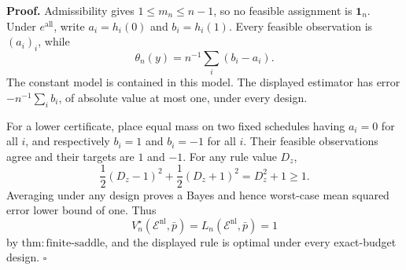 \textbf{Proof.}
Admissibility gives \(1\le m_n\le n-1\), so no feasible assignment is \(\mathbf 1_n\). Under \(e^{\mathrm{all}}\), write \(a_i=h_i(0)\) and \(b_i=h_i(1)\). Every feasible observation is \((a_i)_i\), while
\[
 \theta_n(y)=n^{-1}\sum_i(b_i-a_i). \tag{1}
\]
The constant model is contained in this model. The displayed estimator has error \(-n^{-1}\sum_i b_i\), of absolute value at most one, under every design.

For a lower certificate, place equal mass on two fixed schedules having \(a_i=0\) for all \(i\), and respectively \(b_i=1\) and \(b_i=-1\) for all \(i\). Their feasible observations agree and their targets are \(1\) and \(-1\). For any rule value \(D_z\),
\[
 \frac12(D_z-1)^2+\frac12(D_z+1)^2=D_z^2+1\ge1.
\]
Averaging under any design proves a Bayes and hence worst-case mean squared error lower bound of one. Thus
\[
 V_n^\star(\mathcal E^{\mathrm{nl}},\bar p)
 =L_n(\mathcal E^{\mathrm{nl}},\bar p)=1
\]
by \(\mathrm{thm{:}finite\text{-}saddle}\), and the displayed rule is optimal under every exact-budget design. \(\square\)